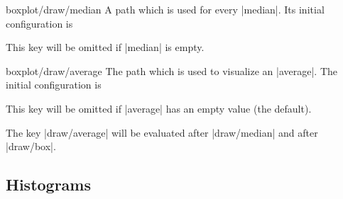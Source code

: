 \begin{pgfplotscodekey}{boxplot/draw/median}
    A path which is used for every |median|. Its initial configuration is
\begin{codeexample}
\end{codeexample}
    This key will be omitted if |median| is empty.
\end{pgfplotscodekey}

\begin{pgfplotscodekey}{boxplot/draw/average}
    The path which is used to visualize an |average|. The initial configuration is
\begin{codeexample}
\end{codeexample}
    This key will be omitted if |average| has an empty value (the default).

    The key |draw/average| will be evaluated after |draw/median| and after
    |draw/box|.
\end{pgfplotscodekey}

\endgroup


\subsection{Histograms}
\label{sec:histograms}

